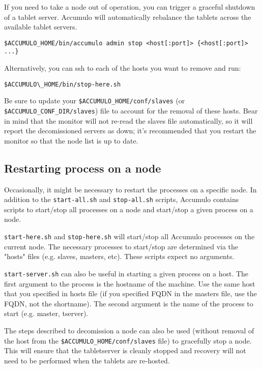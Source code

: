 If you need to take a node out of operation, you can trigger a graceful shutdown of a tablet 
server. Accumulo will automatically rebalance the tablets across the available tablet servers.

\begingroup\fontsize{8pt}{8pt}\selectfont\begin{verbatim}
$ACCUMULO_HOME/bin/accumulo admin stop <host[:port]> {<host[:port]> ...}
\end{verbatim}\endgroup

Alternatively, you can ssh to each of the hosts you want to remove and run:

\begingroup\fontsize{8pt}{8pt}\selectfont\begin{verbatim}
$ACCUMULO\_HOME/bin/stop-here.sh
\end{verbatim}\endgroup

Be sure to update your \texttt{\$ACCUMULO\_HOME/conf/slaves} (or \texttt{\$ACCUMULO\_CONF\_DIR/slaves}) file to 
account for the removal of these hosts. Bear in mind that the monitor will not re-read the 
slaves file automatically, so it will report the decomissioned servers as down; it's 
recommended that you restart the monitor so that the node list is up to date.

\subsection{Restarting process on a node}

Occasionally, it might be necessary to restart the processes on a specific node. In addition
to the \texttt{start-all.sh} and \texttt{stop-all.sh} scripts, Accumulo contains scripts to start/stop all processes
on a node and start/stop a given process on a node.

\texttt{start-here.sh} and \texttt{stop-here.sh} will start/stop all Accumulo processes on the current node. The
necessary processes to start/stop are determined via the "hosts" files (e.g. slaves, masters, etc).
These scripts expect no arguments.

\texttt{start-server.sh} can also be useful in starting a given process on a host.
The first argument to the process is the hostname of the machine. Use the same host that 
you specified in hosts file (if you specified FQDN in the masters file, use the FQDN, not
the shortname). The second argument is the name of the process to start (e.g. master, tserver).

The steps described to decomission a node can also be used (without removal of the host
from the \texttt{\$ACCUMULO\_HOME/conf/slaves} file) to gracefully stop a node. This will
ensure that the tabletserver is cleanly stopped and recovery will not need to be performed
when the tablets are re-hosted.

